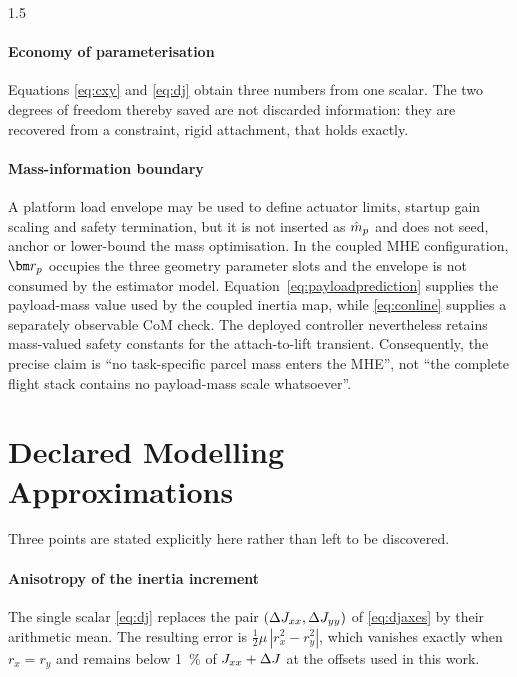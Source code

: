 \begin{spacing}{1.5}
\paragraph{Economy of parameterisation} Equations \eqref{eq:cxy} and
\eqref{eq:dj} obtain three numbers from one scalar. The two degrees of
freedom thereby saved are not discarded information: they are recovered
from a constraint, rigid attachment, that holds exactly.

\paragraph{Mass-information boundary} A platform load envelope may be
used to define actuator limits, startup gain scaling and safety
termination, but it is not inserted as $\hat{m}_p$ and does not seed, anchor
or lower-bound the mass optimisation. In the coupled MHE configuration,
$\rp$ occupies the three geometry parameter slots and the envelope is not
consumed by the estimator model. Equation~\eqref{eq:payloadprediction}
supplies the payload-mass value used by the coupled inertia map, while
\eqref{eq:conline} supplies a separately observable CoM check. The
deployed controller nevertheless retains mass-valued safety constants for
the attach-to-lift transient. Consequently, the precise claim is ``no
task-specific parcel mass enters the MHE'', not ``the complete flight
stack contains no payload-mass scale whatsoever''.

\section{Declared Modelling Approximations}\label{sec:model:approx}

Three points are stated explicitly here rather than left to be
discovered.

\paragraph{Anisotropy of the inertia increment} The single scalar
\eqref{eq:dj} replaces the pair $(\Delta J_{xx}, \Delta J_{yy})$ of
\eqref{eq:djaxes} by their arithmetic mean. The resulting error is
$\tfrac{1}{2}\mu\,|r_x^2 - r_y^2|$, which vanishes exactly when
$r_x = r_y$ and remains below \SI{1}{\percent} of $J_{xx} + \Delta J$ at the
offsets used in this work.


\end{spacing}
